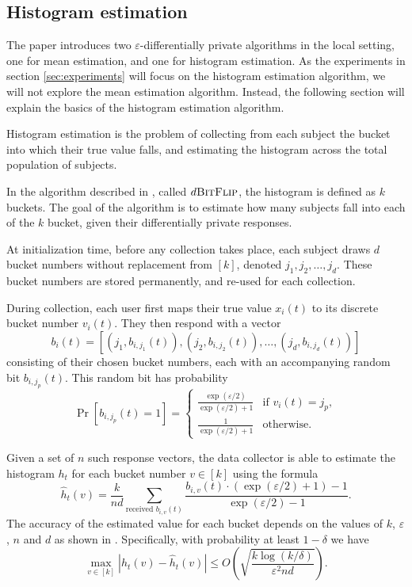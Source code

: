 \documentclass[12pt]{article}
\renewcommand{\epsilon}{\varepsilon}
\begin{document}
\subsection{Histogram estimation \label{sec:histogram_algo}}

The paper introduces two $\epsilon$-differentially private algorithms in the local setting, one for mean estimation, and one for histogram estimation. As the experiments in section \ref{sec:experiments} will focus on the histogram estimation algorithm, we will not explore the mean estimation algorithm. Instead, the following section will explain the basics of the histogram estimation algorithm. \bigskip

Histogram estimation is the problem of collecting from each subject the bucket into which their true value falls, and estimating the histogram across the total population of subjects.

In the algorithm described in \cite{microsoft_telemetry}, called $d\textsc{BitFlip}$, the histogram is defined as $k$ buckets. The goal of the algorithm is to estimate how many subjects fall into each of the $k$ bucket, given their differentially private responses.

At initialization time, before any collection takes place, each subject draws $d$ bucket numbers without replacement from $[k]$, denoted $j_1,j_2,\dots,j_d$. These bucket numbers are stored permanently, and re-used for each collection.

During collection, each user first maps their true value $x_i(t)$ to its discrete bucket number $v_i(t)$. They then respond with a vector $$b_i(t)=\left[ (j_1, b_{i,j_1}(t)), (j_2, b_{i,j_2}(t)), \dots, (j_d, b_{i,j_d}(t)) \right]$$
consisting of their chosen bucket numbers, each with an accompanying random bit $b_{i,j_p}(t)$. This random bit has probability
$$\Pr[b_{i,j_p}(t)=1]=\begin{cases}
    \frac{\exp(\epsilon/2)}{\exp(\epsilon / 2) + 1} & \text{if } v_i(t) = j_p, \\
    \frac{1}{\exp(\epsilon/2) + 1} & \text{otherwise.}
\end{cases}$$

Given a set of $n$ such response vectors, the data collector is able to estimate the histogram $h_t$ for each bucket number $v \in [k]$ using the formula
\begin{equation*}
    \hat{h}_t(v) = \frac{k}{nd} \sum_{\text{received } b_{i,v}(t)} \frac{b_{i,v}(t)\cdot (\exp(\epsilon/2) + 1) - 1}{\exp(\epsilon/2) - 1}.
\end{equation*}
The accuracy of the estimated value for each bucket depends on the values of $k$, $\epsilon$, $n$ and $d$ as shown in \cite[sec.~2.2]{microsoft_telemetry}. Specifically, with probability at least $1 - \delta$ we have
$$
\max_{v \in [k]} |h_t(v) - \hat{h}_t(v)| \leq O\left( \sqrt{\frac{k \log(k/\delta)}{\epsilon^2nd}} \right).
$$ \bigskip
\end{document}
